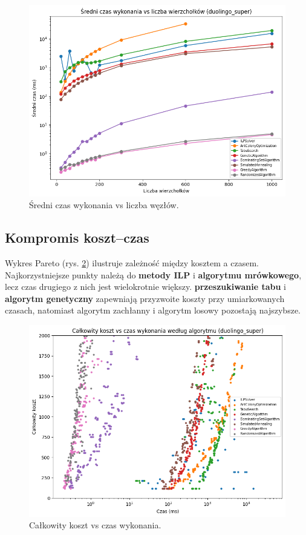 \begin{figure}[H]
  \centering
  \includegraphics[width=0.7\linewidth]{assets/figures/synthetic_time_vs_nodes.png}
  \caption{Średni czas wykonania vs liczba węzłów.}
  \label{fig:synthetic_time_vs_nodes}
\end{figure}

\subsection{Kompromis koszt--czas}

Wykres Pareto (rys. \ref{fig:synthetic_pareto}) ilustruje zależność między kosztem a czasem. Najkorzystniejsze punkty należą do \textbf{metody ILP} i \textbf{algorytmu mrówkowego}, lecz czas drugiego z nich jest wielokrotnie większy. \textbf{przeszukiwanie tabu} i \textbf{algorytm genetyczny} zapewniają przyzwoite koszty przy umiarkowanych czasach, natomiast algorytm zachłanny i algorytm losowy pozostają najszybsze.

\begin{figure}[H]
  \centering
  \includegraphics[width=0.7\linewidth]{assets/figures/synthetic_pareto.png}
  \caption{Całkowity koszt vs czas wykonania.}
  \label{fig:synthetic_pareto}
\end{figure}

